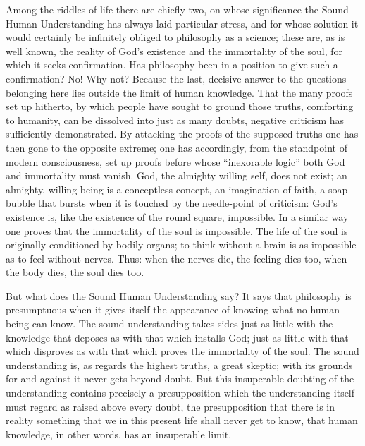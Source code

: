 \documentclass[12pt,a4paper,openany]{book}
\newcommand{\opage}[1]{\marginnote{\footnotesize\textit{[#1]}}}
\begin{document}
Among the riddles of life there are chiefly two, on %
whose significance the Sound Human Understanding has always
laid particular stress, and for whose solution it would certainly
be infinitely obliged to philosophy as a science;
these are, as is well known, the reality of God's existence
and the immortality of the soul, for which it seeks confirmation.
Has philosophy been in a position to give such
a confirmation? No! Why not? Because the
last, decisive answer to the questions belonging here
lies outside the limit of human knowledge.
That the many proofs set up hitherto, by which people
have sought to ground those truths, comforting to humanity,
can be dissolved into just as many doubts,
negative criticism has sufficiently demonstrated. By
attacking the proofs of the supposed truths one
has then gone to the opposite extreme; one has
accordingly, from the standpoint of modern consciousness,
set up proofs before whose ``inexorable logic'' both
God and immortality must vanish. God, the almighty
willing self, does not exist; an almighty, willing being
is a conceptless concept, an imagination of faith, a
soap bubble that bursts when it is touched by the needle-point of criticism:
God's existence is, like the existence of the
round square, impossible. In a similar way one proves
that the immortality of the soul is impossible. The life of the soul
is originally conditioned by bodily organs; to think
without a brain is as impossible as to feel without nerves.
\setcounter{footnote}{0}%
\opage{390}Thus: when the nerves die, the feeling dies too, when the
body dies, the soul dies too.

But what does the Sound Human Understanding say? It
says that philosophy is presumptuous when it gives itself
the appearance of knowing what no human being can know.
The sound understanding takes sides just as little with the
knowledge that deposes as with that which installs God;
just as little with that which disproves as with that which
proves the immortality of the soul. The sound understanding is,
as regards the highest truths, a great skeptic;
with its grounds for and against it never gets beyond
doubt. But this insuperable doubting of the understanding
contains precisely a presupposition which the understanding itself
must regard as raised above every doubt, the presupposition
that there is in reality something that we in this present
life shall never get to know, that human
knowledge, in other words, has an insuperable limit.
\end{document}
